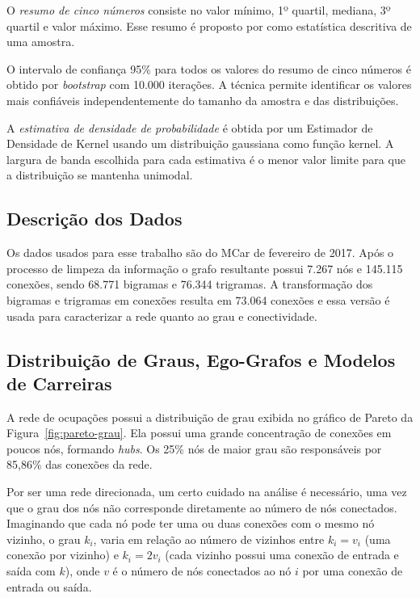 \documentclass[12pt,a4paper]{article}
\begin{document}
O \textit{resumo de cinco números} consiste no valor mínimo, 1º quartil, mediana, 3º quartil e valor máximo. Esse resumo é proposto por  como estatística descritiva de uma amostra.

O intervalo de confiança 95\% para todos os valores do resumo de cinco números é obtido por \textit{bootstrap} com 10.000 iterações. A técnica permite identificar os valores mais confiáveis independentemente do tamanho da amostra e das distribuições.

A \textit{estimativa de densidade de probabilidade} é obtida por um Estimador de Densidade de Kernel usando um distribuição gaussiana como função kernel. A largura de banda escolhida para cada estimativa é o menor valor limite para que a distribuição se mantenha unimodal.


\subsection{Descrição dos Dados}  \label{sec:descricao-dos-dados}

Os dados usados para esse trabalho são do MCar de fevereiro de 2017. Após o processo de limpeza da informação o grafo resultante possui 7.267 nós e 145.115 conexões, sendo 68.771 bigramas e 76.344 trigramas. A transformação dos bigramas e trigramas em conexões resulta em 73.064 conexões e essa versão é usada para caracterizar a rede quanto ao grau e conectividade.


\subsection{Distribuição de Graus, Ego-Grafos e Modelos de Carreiras}  \label{sec:distribuicao-de-graus}

A rede de ocupações possui a distribuição de grau exibida no gráfico de Pareto da Figura~\ref{fig:pareto-grau}. Ela possui uma grande concentração de conexões em poucos nós, formando \textit{hubs}. Os 25\% nós de maior grau são responsáveis por 85,86\% das conexões da rede.

Por ser uma rede direcionada, um certo cuidado na análise é necessário, uma vez que o grau dos nós não corresponde diretamente ao número de nós conectados. Imaginando que cada nó pode ter uma ou duas conexões com o mesmo nó vizinho, o grau $k_i$, varia em relação ao número de vizinhos entre $k_i = v_i$ (uma conexão por vizinho) e $k_i = 2v_i$ (cada vizinho possui uma conexão de entrada e saída com $k$), onde $v$ é o número de nós conectados ao nó $i$ por uma conexão de entrada ou saída.
\end{document}
